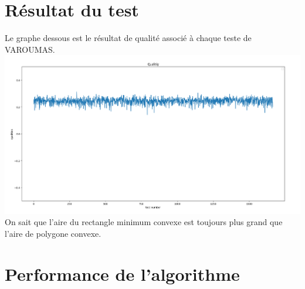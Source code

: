 \documentclass[14px]{article}
\begin{document}
\section{Résultat du test}
Le graphe dessous est le résultat de qualité associé à chaque teste de VAROUMAS.\\
\includegraphics[width=\textwidth]{quality_graph.png}\\
On sait que l'aire du rectangle minimum convexe est toujours plus grand que l'aire de polygone convexe.


\section{Performance de l'algorithme}
\end{document}
